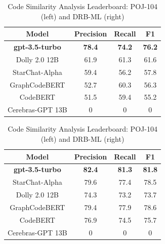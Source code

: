 \begin{table}[htbp]
\caption{Code Similarity Analysis Leaderboard: POJ-104 (left) and DRB-ML (right)}
\label{tab:hpctask1}
\begin{minipage}{.5\linewidth}
  \begin{tabular}{|c|c|c|c|}
  \hline
  \textbf{Model} & \textbf{Precision}              & \textbf{Recall}                 & \textbf{F1}                     \\ \hline
  \textbf{gpt-3.5-turbo}     & \textbf{78.4}                   & \textbf{74.2}                   & \textbf{76.2}         \\ \hline
  Dolly 2.0 12B  & 61.9                   & 61.3                   & 61.6                   \\ \hline
StarChat-Alpha  & 59.4                      & 56.2                      & 57.8            \\ \hline
GraphCodeBERT   & 52.7                   & 60.3                   & 56.3             \\ \hline
CodeBERT        & 51.5                   & 59.4                   & 55.2          \\ \hline
Cerebras-GPT 13B   & 0                      & 0                      & 0              \\ \hline        
\end{tabular}
\end{minipage}
\hspace{0.1cm}
\begin{minipage}{.5\linewidth}
  \begin{tabular}{|c|c|c|c|}
\hline
\textbf{Model} & \textbf{Precision}              & \textbf{Recall}                 & \textbf{F1}                     \\ \hline
\textbf{gpt-3.5-turbo}     & \textbf{82.4}                   & \textbf{81.3}                   & \textbf{81.8}           \\ \hline
StarChat-Alpha  & 79.6                   & 77.4                   & 78.5                   \\ \hline
Dolly 2.0 12B  & 74.3                      & 73.2                      & 73.7            \\ \hline
GraphCodeBERT   & 79.4                   & 77.9                   & 78.6            \\ \hline
CodeBERT        & 76.9                   & 74.5                   & 75.7          \\ \hline
Cerebras-GPT 13B    & 0                      & 0                      & 0              \\ \hline            
\end{tabular}  
\end{minipage}
\end{table}


